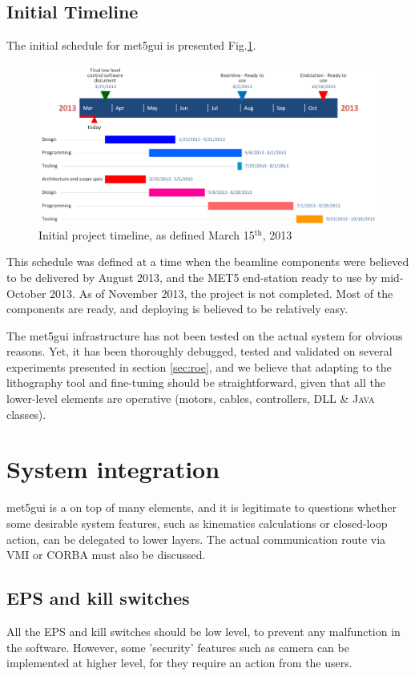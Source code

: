 \documentclass[10pt,letter,twoside]{report}
\begin{document}
\subsection{Initial Timeline}
The initial schedule for met5gui is presented Fig.\ref{fig:timeline}.
\begin{figure}[ht]
	\centerline{\includegraphics[width=\textwidth]{img/schedule.png}}
	\caption{Initial project timeline, as defined March 15$^{\mbox{th}}$, 2013}
	\label{fig:timeline}
\end{figure}
This schedule was defined at a time when the beamline components were believed to be delivered by August 2013, and the MET5 end-station ready to use by mid-October 2013. As of November 2013, the project is not completed. Most of the components are ready, and deploying is believed to be relatively easy.

The met5gui infrastructure has not been tested on the actual system for obvious reasons. 
Yet, it has been thoroughly debugged, tested and validated on several experiments presented in section \ref{sec:roe}, and we believe that adapting to the lithography tool and fine-tuning should be straightforward, given that all the lower-level elements are operative (motors, cables, controllers, DLL \& \textsc{Java} classes).

\section{System integration}
met5gui is a on top of many elements, and it is legitimate to questions whether some desirable system features, such as kinematics calculations or closed-loop action, can be delegated to lower layers. The actual communication route via \textsc{VMI} or \textsc{CORBA} must also be discussed.

\subsection{EPS and kill switches}
All the EPS and kill switches should be low level, to prevent any malfunction in the software.
However, some 'security' features such as camera can be implemented at higher level, for they require an action from the users.
\end{document}
